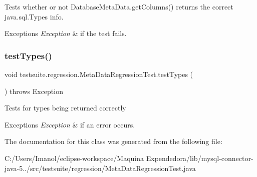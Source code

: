 Tests whether or not Database\+Meta\+Data.\+get\+Columns() returns the correct java.\+sql.\+Types info.


\begin{DoxyExceptions}{Exceptions}
{\em Exception} & if the test fails. \\
\hline
\end{DoxyExceptions}
\mbox{\label{classtestsuite_1_1regression_1_1_meta_data_regression_test_a538c5b4ba85f2b4160bcaa4885f13142}} 
\subsubsection{\texorpdfstring{test\+Types()}{testTypes()}}
{\footnotesize\ttfamily void testsuite.\+regression.\+Meta\+Data\+Regression\+Test.\+test\+Types (\begin{DoxyParamCaption}{ }\end{DoxyParamCaption}) throws Exception}

Tests for types being returned correctly


\begin{DoxyExceptions}{Exceptions}
{\em Exception} & if an error occurs. \\
\hline
\end{DoxyExceptions}


The documentation for this class was generated from the following file\+:\begin{DoxyCompactItemize}
\item 
C\+:/\+Users/\+Imanol/eclipse-\/workspace/\+Maquina Expendedora/lib/mysql-\/connector-\/java-\/5../src/testsuite/regression/Meta\+Data\+Regression\+Test.\+java\end{DoxyCompactItemize}
